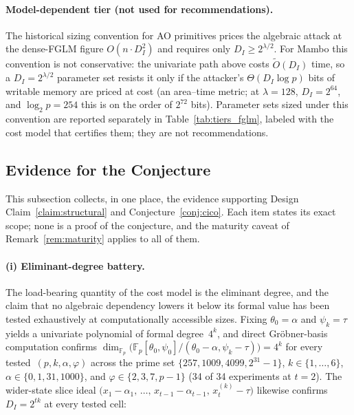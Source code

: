\documentclass[11pt,a4paper]{article}
\theoremstyle{definition}
\newcommand{\Fp}{\mathbb{F}_p}
\begin{document}
\paragraph{Model-dependent tier (not used for recommendations).}
The historical sizing convention for AO primitives prices the
algebraic attack at the dense-FGLM figure $O(n \cdot D_I^2)$ and
requires only $D_I \ge 2^{\lambda/2}$. For Mambo this convention is
not conservative: the univariate path above costs
$\widetilde{O}(D_I)$ time, so a $D_I = 2^{\lambda/2}$ parameter set
resists it only if the attacker's $\Theta(D_I \log p)$ bits of
writable memory are priced at cost (an area--time metric; at
$\lambda = 128$, $D_I = 2^{64}$, and $\log_2 p = 254$ this is on the
order of $2^{72}$ bits). Parameter sets sized under this convention
are reported separately in Table~\ref{tab:tiers_fglm}, labeled with
the cost model that certifies them; they are not recommendations.


\subsection{Evidence for the Conjecture}\label{sec:security:evidence}

This subsection collects, in one place, the evidence supporting
Design Claim~\ref{claim:structural} and
Conjecture~\ref{conj:cico}. Each item states its exact scope; none
is a proof of the conjecture, and the maturity caveat of
Remark~\ref{rem:maturity} applies to all of them.

\paragraph{(i) Eliminant-degree battery.}
The load-bearing quantity of the cost model is the eliminant degree,
and the claim that no algebraic dependency lowers it below its
formal value has been tested exhaustively at computationally
accessible sizes. Fixing $\theta_0=\alpha$ and $\psi_k=\tau$ yields a
univariate polynomial of formal degree~$4^{k}$, and direct
Gr{\"o}bner-basis computation confirms
$\dim_{\Fp}\bigl(\Fp[\theta_0,\psi_0]\big/(\theta_0-\alpha,\psi_k-\tau)\bigr)
=4^{k}$ for every tested~$(p,k,\alpha,\varphi)$ across the prime set
$\{257,1009,4099,2^{31}-1\}$, $k\in\{1,\dots,6\}$,
$\alpha\in\{0,1,31,1000\}$, and $\varphi\in\{2,3,7,p-1\}$ (34 of 34
experiments at $t=2$).\label{rem:hcp_dI} The wider-state slice ideal
$\bigl(x_{1}{-}\alpha_1,\,\dots,\,x_{t-1}{-}\alpha_{t-1},\,
        x_t^{(k)}{-}\tau\bigr)$
likewise confirms $D_I = 2^{tk}$ at every tested
cell:\label{rem:hcp_widerstate}
\end{document}
